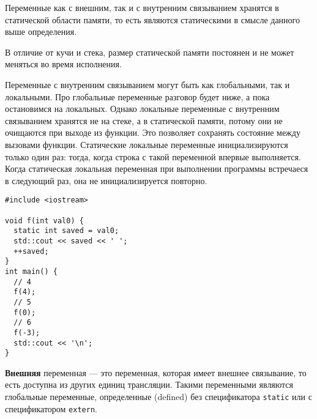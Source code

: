 Переменные как с внешним, так и с внутренним связыванием хранятся в статической области
памяти, то есть являются статическими в смысле данного выше определения.

В отличие от кучи и стека, размер статической памяти постоянен и не может меняться во время
исполнения.

Переменные с внутренним связыванием могут быть как глобальными, так и локальными.
Про глобальные переменные разговор будет ниже, а пока остановимся на локальных.
Однако локальные переменные с внутренним связыванием хранятся не на стеке, а в статической
памяти, потому они не очищаются при выходе из функции. Это позволяет сохранять состояние
между вызовами функции. Статические локальные переменные инициализируются только один раз:
тогда, когда строка с такой переменной впервые выполняется. Когда статическая локальная переменная
при выполнении программы встречаеся в следующий раз, она не инициализируется повторно.
\begin{verbatim}
#include <iostream>

void f(int val0) {
  static int saved = val0;
  std::cout << saved << ' ';
  ++saved;
}
int main() {
  // 4
  f(4);
  // 5
  f(0);
  // 6
  f(-3);
  std::cout << '\n';
}
\end{verbatim}

\textbf{Внешняя} переменная --- это переменная, которая имеет внешнее связывание,
то есть доступна из других единиц трансляции. Такими переменными
являются глобальные переменные, определенные (defined) без спецификатора \verb|static| или с
спецификатором \verb|extern|.

